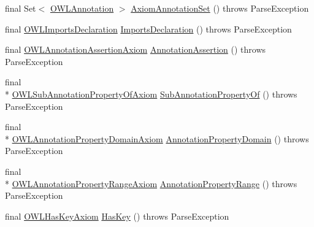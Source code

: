 \begin{DoxyCompactItemize}
\item 
final Set$<$ \hyperlink{interfaceorg_1_1semanticweb_1_1owlapi_1_1model_1_1_o_w_l_annotation}{O\-W\-L\-Annotation} $>$ \hyperlink{classorg_1_1coode_1_1owlapi_1_1functionalparser_1_1_o_w_l_functional_syntax_parser_afbd7b7a98ef511eed1c989b913105af9}{Axiom\-Annotation\-Set} ()  throws Parse\-Exception 
\item 
final \hyperlink{interfaceorg_1_1semanticweb_1_1owlapi_1_1model_1_1_o_w_l_imports_declaration}{O\-W\-L\-Imports\-Declaration} \hyperlink{classorg_1_1coode_1_1owlapi_1_1functionalparser_1_1_o_w_l_functional_syntax_parser_a72478345905f94f07d6ac7ca49a722da}{Imports\-Declaration} ()  throws Parse\-Exception 
\item 
final \hyperlink{interfaceorg_1_1semanticweb_1_1owlapi_1_1model_1_1_o_w_l_annotation_assertion_axiom}{O\-W\-L\-Annotation\-Assertion\-Axiom} \hyperlink{classorg_1_1coode_1_1owlapi_1_1functionalparser_1_1_o_w_l_functional_syntax_parser_aab20bdb7192e4fd228bd162f32e729f6}{Annotation\-Assertion} ()  throws Parse\-Exception 
\item 
final \\*
\hyperlink{interfaceorg_1_1semanticweb_1_1owlapi_1_1model_1_1_o_w_l_sub_annotation_property_of_axiom}{O\-W\-L\-Sub\-Annotation\-Property\-Of\-Axiom} \hyperlink{classorg_1_1coode_1_1owlapi_1_1functionalparser_1_1_o_w_l_functional_syntax_parser_a27ef9e2949a0777e5f6b1740de70b66b}{Sub\-Annotation\-Property\-Of} ()  throws Parse\-Exception 
\item 
final \\*
\hyperlink{interfaceorg_1_1semanticweb_1_1owlapi_1_1model_1_1_o_w_l_annotation_property_domain_axiom}{O\-W\-L\-Annotation\-Property\-Domain\-Axiom} \hyperlink{classorg_1_1coode_1_1owlapi_1_1functionalparser_1_1_o_w_l_functional_syntax_parser_a9fbf41e11f3f8bcb0b7d18597150097c}{Annotation\-Property\-Domain} ()  throws Parse\-Exception 
\item 
final \\*
\hyperlink{interfaceorg_1_1semanticweb_1_1owlapi_1_1model_1_1_o_w_l_annotation_property_range_axiom}{O\-W\-L\-Annotation\-Property\-Range\-Axiom} \hyperlink{classorg_1_1coode_1_1owlapi_1_1functionalparser_1_1_o_w_l_functional_syntax_parser_ade125aa68ca70a432fb49dc247790cee}{Annotation\-Property\-Range} ()  throws Parse\-Exception 
\item 
final \hyperlink{interfaceorg_1_1semanticweb_1_1owlapi_1_1model_1_1_o_w_l_has_key_axiom}{O\-W\-L\-Has\-Key\-Axiom} \hyperlink{classorg_1_1coode_1_1owlapi_1_1functionalparser_1_1_o_w_l_functional_syntax_parser_a6a1a87f5acb4ed404fc14217aa60276e}{Has\-Key} ()  throws Parse\-Exception 

\end{DoxyCompactItemize}
